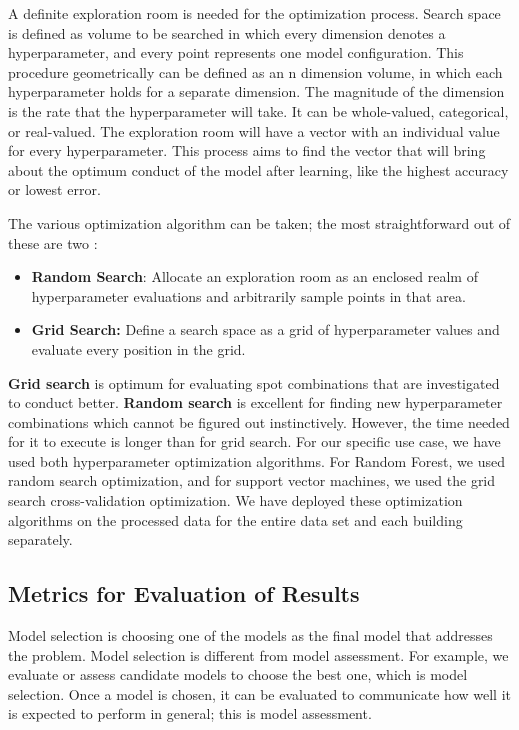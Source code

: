 \documentclass[a4paper,singleside,12pt]{report} %
\begin{document}
				A definite exploration room is needed for the optimization process. 
				Search space is defined as volume to be searched in which every dimension denotes a hyperparameter, and every point represents one model configuration. 
				This procedure geometrically can be defined as an n dimension volume, in which each hyperparameter holds for a separate dimension. 
				The magnitude of the dimension is the rate that the hyperparameter will take. It can be whole-valued, categorical, or real-valued. 
				The exploration room will have a vector with an individual value for every hyperparameter. 
				This process aims to find the vector that will bring about the optimum conduct of the model after learning, like the highest accuracy or lowest error.
				
				The various optimization algorithm can be taken; the most straightforward out of these are two :
				
				\begin{itemize}
				
				\item \textbf{Random Search}: Allocate an exploration room as an enclosed realm of hyperparameter evaluations and arbitrarily sample points in that area.
				\item \textbf{Grid Search:} Define a search space as a grid of hyperparameter values and evaluate every position in the grid.
				
				\end{itemize}	
				
				
				\textbf{Grid search} is optimum for evaluating spot combinations that are investigated to conduct better. 
				\textbf{Random search}  is excellent for finding new hyperparameter combinations which cannot be figured out instinctively. 
				However, the time needed for it to execute is longer than for grid search.  
				For our specific use case, we have used both hyperparameter optimization algorithms. 
				For Random Forest, we used random search optimization, and for support vector machines, we used the grid search cross-validation optimization. 
				We have deployed these optimization algorithms on the processed data for the entire data set and each building separately.

			\subsection{Metrics for Evaluation of Results}

				Model selection is choosing one of the models as the final model that addresses the problem. 
				Model selection is different from model assessment.
				For example, we evaluate or assess candidate models to choose the best one, which is model selection. 
				Once a model is chosen, it can be evaluated to communicate how well it is expected to perform in general; this is model assessment.
				
\end{document}
